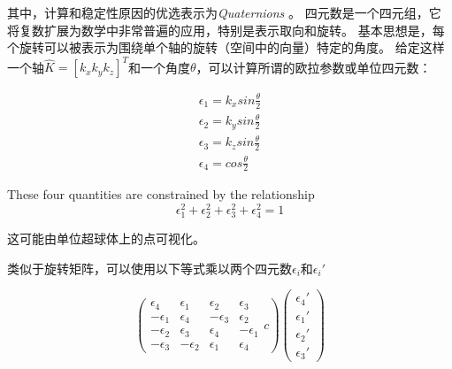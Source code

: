 其中，计算和稳定性原因的优选表示为\emph {Quaternions} 。 四元数是一个四元组，它将复数扩展为数学中非常普遍的应用，特别是表示取向和旋转。 基本思想是，每个旋转可以被表示为围绕单个轴的旋转（空间中的向量）特定的角度。 给定这样一个轴$ \hat {K} = [k_x k_y k_z] ^ T $和一个角度$ \theta $，可以计算所谓的欧拉参数或单位四元数：

\begin{eqnarray}
\epsilon_1=k_x sin \frac{\theta}{2}\\
\epsilon_2=k_y sin \frac{\theta}{2}\\
\epsilon_3=k_z sin \frac{\theta}{2}\\
\epsilon_4=cos\frac{\theta}{2}
\end{eqnarray}

These four quantities are constrained by the relationship
\begin{equation}
\epsilon_1^2+\epsilon_2^2+\epsilon_3^2+\epsilon_4^2=1
\end{equation}

这可能由单位超球体上的点可视化。


类似于旋转矩阵，可以使用以下等式乘以两个四元数$ \epsilon_i $和$ \epsilon_i'$

\begin{equation}
\left(
\begin{array}{cccc}
\epsilon_4 & \epsilon_1 & \epsilon_2 & \epsilon_3\\
-\epsilon_1 & \epsilon_4 & -\epsilon_3 & \epsilon_2\\
-\epsilon_2 & \epsilon_3 & \epsilon_4 & -\epsilon_1\\
-\epsilon_3 & -\epsilon_2 & \epsilon_1 & \epsilon_4
\end{array}{c}
\right)
\left(\begin{array}{c}\epsilon_4'\\\epsilon_1'\\\epsilon_2'\\\epsilon_3'\end{array}\right)
\end{equation}

